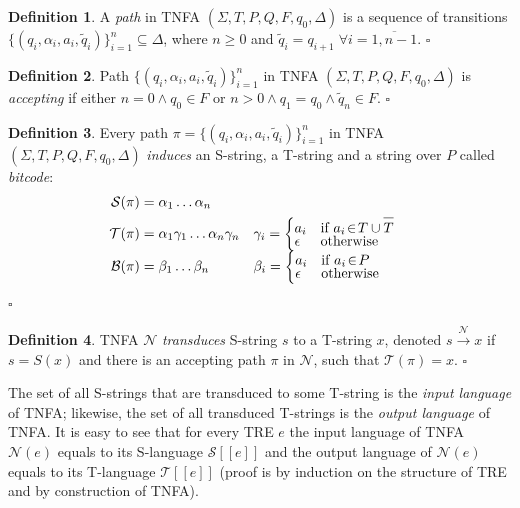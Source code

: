 \documentclass{article}
\newcommand{\Xin}{\!\in\!}
\newcommand{\Xeq}{\!=\!}
\newcommand{\Xlb}{[\![}
\newcommand{\Xrb}{]\!]}
\newcommand{\XB}{\mathcal{B}}
\newcommand{\XN}{\mathcal{N}}
\newcommand{\XS}{\mathcal{S}}
\newcommand{\XT}{\mathcal{T}}
\newcommand*{\Xbar}[1]{\overline{#1\vphantom{\bar{#1}}}}
\theoremstyle{definition}
\newtheorem{Xdef}{Definition}
\begin{document}
\begin{multicols}{2}
    \begin{Xdef}
    A \emph{path} in TNFA $(\Sigma, T, P, Q, F, q_0, \Delta)$ is a sequence of transitions
    $\{(q_i, \alpha_i, a_i, \widetilde{q}_i)\}_{i=1}^n \subseteq \Delta$, where $n \!\geq\! 0$
    and $\widetilde{q}_i \Xeq q_{i+1} \; \forall i \Xeq \overline{1,n-1}$.
    $\square$
    \end{Xdef}

    \begin{Xdef}
    Path $\{(q_i, \alpha_i, a_i, \widetilde{q}_i)\}_{i=1}^n$ in TNFA $(\Sigma, T, P, Q, F, q_0, \Delta)$ is \emph{accepting}
    if either $n \Xeq 0 \wedge q_0 \Xin F$ or $n\!>\!0 \wedge q_1 \Xeq q_0 \wedge \widetilde{q}_n \Xin F$.
    $\square$
    \end{Xdef}

    \begin{Xdef}
    Every path $\pi \Xeq \{(q_i, \alpha_i, a_i, \widetilde{q}_i)\}_{i=1}^n$
    in TNFA $(\Sigma, T, P, Q, F, q_0, \Delta)$
    \emph{induces} an S-string, a T-string and a string over $P$ called \emph{bitcode}:
    \begin{align*}
    \XS(\pi) &= \alpha_1 \dots \alpha_n \\
    \XT(\pi) &= \alpha_1 \gamma_1 \dots \alpha_n \gamma_n
    &&\gamma_i = \begin{cases}
            a_i &\text{if } a_i \Xin T \cup \Xbar{T} \\[-0.5em]
            \epsilon &\text{otherwise}
        \end{cases} \\[-0.5em]
    \XB(\pi) &= \beta_1 \dots \beta_n
    &&\beta_i = \begin{cases}
            a_i &\text{if } a_i \Xin P \\[-0.5em]
            \epsilon &\text{otherwise}
        \end{cases}
    \end{align*}
    $\square$
    \end{Xdef}

    \begin{Xdef}
    TNFA $\XN$ \emph{transduces} S-string $s$ to a T-string $x$, denoted $s \xrightarrow{\XN} x$
    if $s \Xeq S(x)$ and there is an accepting path $\pi$ in $\XN$, such that $\XT(\pi) \Xeq x$.
    $\square$
    \end{Xdef}

The set of all S-strings that are transduced to some T-string is the \emph{input language} of TNFA;
likewise, the set of all transduced T-strings is the \emph{output language} of TNFA.
It is easy to see that for every TRE $e$ the input language of TNFA $\XN(e)$ equals to its S-language $\XS \Xlb e \Xrb$
and the output language of $\XN(e)$ equals to its T-language $\XT \Xlb e \Xrb$
(proof is by induction on the structure of TRE and by construction of TNFA).
\\


\end{multicols}
\end{document}
